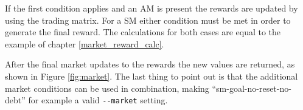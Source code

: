 
If the first condition applies and an AM is present the rewards are updated by using the trading matrix. For a SM either condition must be met in order to generate the final reward. The calculations for both cases are equal to the example of chapter \ref{market_reward_calc}.

After the final market updates to the rewards the new values are returned, as shown in Figure \ref{fig:market}. The last thing to point out is that the additional market conditions can be used in combination, making ``sm-goal-no-reset-no-debt'' for example a valid \verb|--market| setting.

